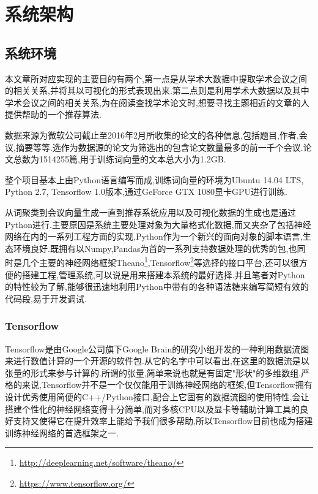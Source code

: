 



\chapter{系统架构}
\label{chap:archi}

\section{系统环境}

本文章所对应实现的主要目的有两个,第一点是从学术大数据中提取学术会议之间的相关关系,并将其以可视化的形式表现出来.第二点则是利用学术大数据以及其中学术会议之间的相关关系,为在阅读查找学术论文时,想要寻找主题相近的文章的人提供帮助的一个推荐算法.

数据来源为微软公司截止至2016年2月所收集的论文的各种信息,包括题目,作者,会议,摘要等等.选作为数据源的论文为筛选出的包含论文数量最多的前一千个会议.论文总数为1514255篇,用于训练词向量的文本总大小为1.2GB.

整个项目基本上由Python语言编写而成,训练词向量的环境为Ubuntu 14.04 LTS, Python 2.7, Tensorflow 1.0版本,通过GeForce GTX 1080显卡GPU进行训练.

从词聚类到会议向量生成一直到推荐系统应用以及可视化数据的生成也是通过Python进行.主要原因是系统主要处理对象为大量格式化数据,而又夹杂了包括神经网络在内的一系列工程方面的实现,Python作为一个新兴的面向对象的脚本语言,生态环境良好.既拥有以Numpy,Pandas为首的一系列支持数据处理的优秀的包,也同时是几个主要的神经网络框架Theano\footnote{\url{http://deeplearning.net/software/theano/}},Tensorflow\footnote{\url{https://www.tensorflow.org/}}等选择的接口平台,还可以很方便的搭建工程,管理系统,可以说是用来搭建本系统的最好选择.并且笔者对Python的特性较为了解,能够很迅速地利用Python中带有的各种语法糖来编写简短有效的代码段,易于开发调试.



\subsection{Tensorflow}

Tensorflow是由Google公司旗下Google Brain的研究小组开发的一种利用数据流图来进行数值计算的一个开源的软件包.从它的名字中可以看出,在这里的数据流是以张量的形式来参与计算的.所谓的张量,简单来说也就是有固定"形状"的多维数组.严格的来说,Tensorflow并不是一个仅仅能用于训练神经网络的框架,但Tensorflow拥有设计优秀使用简便的C++/Python接口,配合上它固有的数据流图的使用特性,会让搭建个性化的神经网络变得十分简单,而对多核CPU以及显卡等辅助计算工具的良好支持又使得它在提升效率上能给予我们很多帮助,所以Tensorflow目前也成为搭建训练神经网络的首选框架之一.

